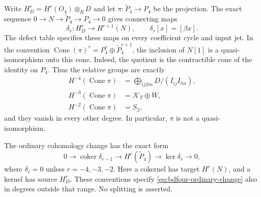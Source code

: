 Write $H_D^r=H^r(O_4)\otimes_R D$ and let $\pi:\widetilde P_4\to P_4$ be the projection.
The exact sequence $0\to N\to\widetilde P_4\to P_4\to0$ gives connecting maps
\[
 \delta_r:H_D^r\longrightarrow H^{r+1}(N),\qquad
 \delta_r[x]=[\beta x].
\]
The defect table specifies these maps on every coefficient cycle and input jet.
In the convention $\operatorname{Cone}(\pi)^r=P_4^r\oplus\widetilde P_4^{r+1}$, the inclusion of $N[1]$ is a quasi-isomorphism onto this cone.
Indeed, the quotient is the contractible cone of the identity on $P_4$.
Thus the relative groups are exactly
\begin{equation}\label{eq:bdfour-relative}
 \begin{aligned}
 H^{-4}(\operatorname{Cone}\pi)&=\bigoplus_{ij|lm}D/(I_{ij}I_{lm}),\\
 H^{-3}(\operatorname{Cone}\pi)&=\mathcal K_T\oplus W,\\
 H^{-2}(\operatorname{Cone}\pi)&=S_2,
 \end{aligned}
\end{equation}
and they vanish in every other degree.
In particular, $\pi$ is not a quasi-isomorphism.

The ordinary cohomology change has the exact form
\begin{equation}\label{eq:bdfour-ordinary-change}
 0\longrightarrow\operatorname{coker}\delta_{r-1}
 \longrightarrow H^r(\widetilde P_4)
 \longrightarrow\ker\delta_r\longrightarrow0,
\end{equation}
where $\delta_r=0$ unless $r=-4,-3,-2$.
Here a cokernel has target $H^r(N)$, and a kernel has source $H_D^r$.
These conventions specify \eqref{eq:bdfour-ordinary-change} also in degrees outside that range.
No splitting is asserted.

